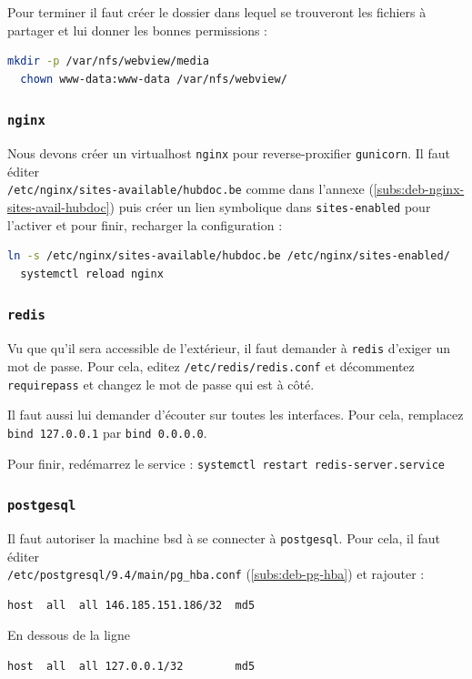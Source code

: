 \documentclass[10pt,a4paper]{article}
\begin{document}
Pour terminer il faut créer le dossier dans lequel se trouveront les fichiers à partager et lui donner les bonnes permissions :
\begin{lstlisting}[language=bash]
  mkdir -p /var/nfs/webview/media
  chown www-data:www-data /var/nfs/webview/
\end{lstlisting}

\subsubsection{\texttt{nginx}}

Nous devons créer un virtualhost \texttt{nginx} pour reverse-proxifier \texttt{gunicorn}.
Il faut éditer \\\texttt{/etc/nginx/sites-available/hubdoc.be} comme dans l'annexe (\ref{subs:deb-nginx-sites-avail-hubdoc})
puis créer un lien symbolique dans \texttt{sites-enabled} pour l'activer et pour finir,
recharger la configuration :
\begin{lstlisting}[language=bash]
  ln -s /etc/nginx/sites-available/hubdoc.be /etc/nginx/sites-enabled/
  systemctl reload nginx
\end{lstlisting}

\subsubsection{\texttt{redis}}

Vu que qu'il sera accessible de l'extérieur,
il faut demander à \texttt{redis} d'exiger un mot de passe.
Pour cela, editez \texttt{/etc/redis/redis.conf} et décommentez \texttt{requirepass}
et changez le mot de passe qui est à côté.

Il faut aussi lui demander d'écouter sur toutes les interfaces.
Pour cela, remplacez \texttt{bind 127.0.0.1} par \texttt{bind 0.0.0.0}.

Pour finir, redémarrez le service : \texttt{systemctl restart redis-server.service}


\subsubsection{\texttt{postgesql}}

Il faut autoriser la machine bsd à se connecter à \texttt{postgesql}.
Pour cela, il faut éditer \\\texttt{/etc/postgresql/9.4/main/pg\_hba.conf} (\ref{subs:deb-pg-hba}) et rajouter :
\begin{lstlisting}[language=bash]
  host  all  all 146.185.151.186/32  md5
\end{lstlisting}
En dessous de la ligne
\begin{lstlisting}[language=bash]
  host  all  all 127.0.0.1/32        md5
\end{lstlisting}
\end{document}
